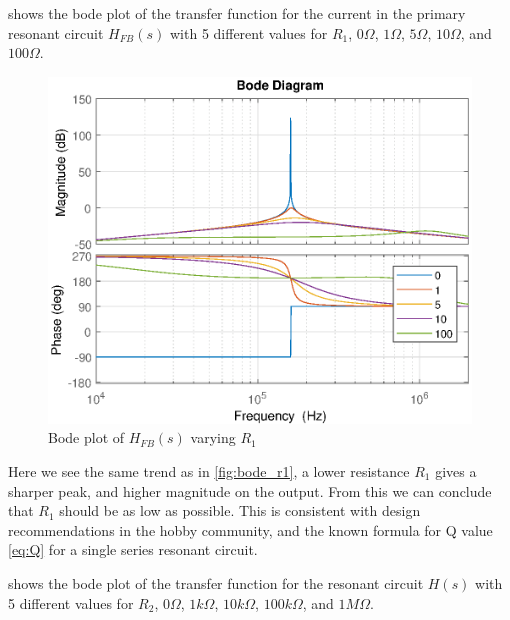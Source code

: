 \newpage
{} shows the bode plot of the transfer function for the current in the primary resonant circuit $H_{FB}(s)$ with 5 different values for $R_1$, $0\Omega$, $1\Omega$, $5\Omega$, $10\Omega$, and $100\Omega$.
\begin{figure}[H]
    \centering
    \includegraphics[width=\textwidth]{img/FeedBackBode_R1.eps}
    \caption{Bode plot of $H_{FB}(s)$ varying $R_1$}
    \label{fig:fbbode_r1}
\end{figure}

Here we see the same trend as in \cref{fig:bode_r1}, a lower resistance $R_1$ gives a sharper peak, and higher magnitude on the output. From this we can conclude that $R_1$ should be as low as possible. This is consistent with design recommendations in the hobby community, and the known formula for Q value \cref{eq:Q} for a single series resonant circuit.

\newpage
{} shows the bode plot of the transfer function for the resonant circuit $H(s)$ with 5 different values for $R_2$, $0\Omega$, $1k\Omega$, $10k\Omega$, $100k\Omega$, and $1M\Omega$.

